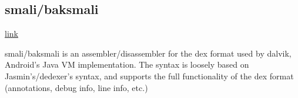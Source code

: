 \subsection{smali/baksmali}

\href{https://github.com/JesusFreke/smali}{link}

smali/baksmali is an assembler/disassembler for the dex format used by dalvik,
Android's Java VM implementation. The syntax is loosely based on
Jasmin's/dedexer's syntax, and supports the full functionality of the dex format
(annotations, debug info, line info, etc.)








